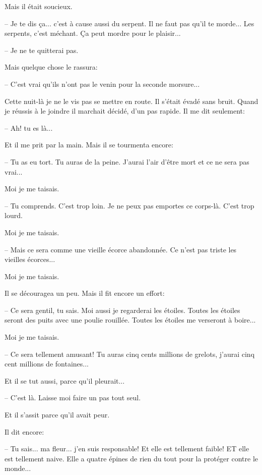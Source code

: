 \documentclass[a4paper]{report}
\begin{document}
Mais il était soucieux.

-- Je te dis ça... c'est à cause aussi du serpent. Il ne faut pas qu'il te morde... Les serpents, c'est méchant. Ça peut mordre pour le plaisir...

-- Je ne te quitterai pas.

Mais quelque chose le rassura:

-- C'est vrai qu'ils n'ont pas le venin pour la seconde morsure...

Cette nuit-là je ne le vis pas se mettre en route. Il s'était évadé sans bruit. Quand je réussis à le joindre il marchait décidé, d'un pas rapide. Il me dit seulement:

-- Ah! tu es là...

Et il me prit par la main. Mais il se tourmenta encore:

-- Tu as eu tort. Tu auras de la peine. J'aurai l'air d'être mort et ce ne sera pas vrai...

Moi je me taisais.

-- Tu comprends. C'est trop loin. Je ne peux pas emportes ce corps-là. C'est trop lourd.

Moi je me taisais.

-- Mais ce sera comme une vieille écorce abandonnée. Ce n'est pas triste les vieilles écorces...

Moi je me taisais.

Il se découragea un peu. Mais il fit encore un effort:

-- Ce sera gentil, tu sais. Moi aussi je regarderai les étoiles. Toutes les étoiles seront des puits avec une poulie rouillée. Toutes les étoiles me verseront à boire...

Moi je me taisais.

-- Ce sera tellement amusant! Tu auras cinq cents millions de grelots, j'aurai cinq cent millions de fontaines...

Et il se tut aussi, parce qu'il pleurait...

-- C'est là. Laisse moi faire un pas tout seul.

Et il s'assit parce qu'il avait peur. 


Il dit encore:

-- Tu sais... ma fleur... j'en suis responsable! Et elle est tellement faible! ET elle est tellement naive. Elle a quatre épines de rien du tout pour la protéger contre le monde... 

\end{document}
